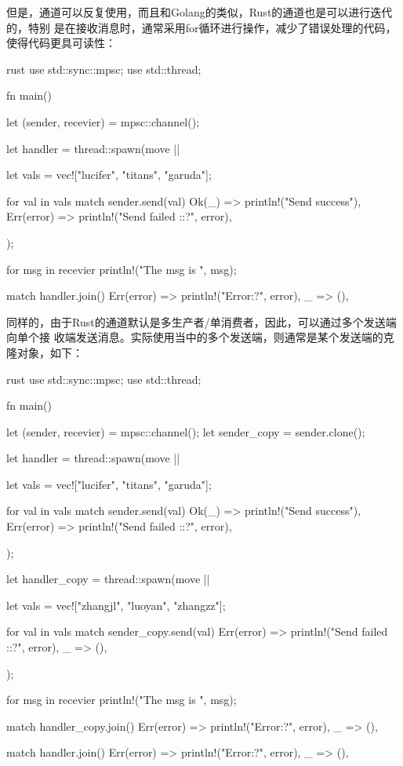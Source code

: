 但是，通道可以反复使用，而且和Golang的类似，Rust的通道也是可以进行迭代的，特别
是在接收消息时，通常采用for循环进行操作，减少了错误处理的代码，使得代码更具可读性：
\begin{code-block}{rust}
use std::sync::mpsc;
use std::thread;

fn main() {
    let (sender, recevier) = mpsc::channel();

    let handler = thread::spawn(move || {

        let vals = vec!["lucifer", "titans", "garuda"];

        for val in vals {
            match sender.send(val) {
                Ok(_) => println!("Send success"),
                Err(error) => println!("Send failed :{:?}", error),
            }
        }

    });

    for msg in recevier {
        println!("The msg is {}", msg);
    }

    match handler.join() {
        Err(error) => println!("Error{:?}", error),
        _ => (),
    }
}
\end{code-block}

同样的，由于Rust的通道默认是多生产者/单消费者，因此，可以通过多个发送端向单个接
收端发送消息。实际使用当中的多个发送端，则通常是某个发送端的克隆对象，如下：
\begin{code-block}{rust}
use std::sync::mpsc;
use std::thread;

fn main() {
    let (sender, recevier) = mpsc::channel();
    let sender_copy = sender.clone();

    let handler = thread::spawn(move || {
        let vals = vec!["lucifer", "titans", "garuda"];

        for val in vals {
            match sender.send(val) {
                Ok(_) => println!("Send success"),
                Err(error) => println!("Send failed :{:?}", error),
            }
        }
    });

    let handler_copy = thread::spawn(move || {
        let vals = vec!["zhangjl", "luoyan", "zhangzz"];

        for val in vals {
            match sender_copy.send(val) {
                Err(error) => println!("Send failed :{:?}", error),
                _ => (),
            }
        }
    });

    for msg in recevier {
        println!("The msg is {}", msg);
    }

    match handler_copy.join() {
        Err(error) => println!("Error{:?}", error),
        _ => (),
    }

    match handler.join() {
        Err(error) => println!("Error{:?}", error),
        _ => (),
    }
}
\end{code-block}

